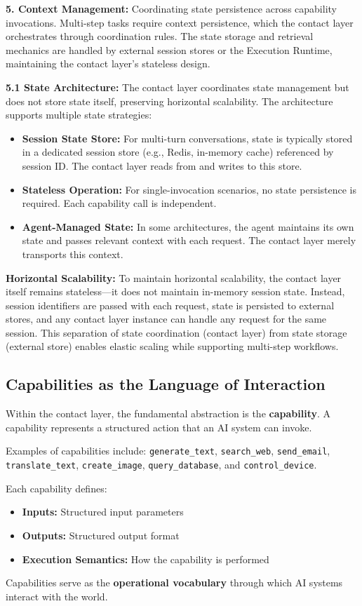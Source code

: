 \textbf{5. Context Management:} Coordinating state persistence across capability invocations. Multi-step tasks require context persistence, which the contact layer orchestrates through coordination rules. The state storage and retrieval mechanics are handled by external session stores or the Execution Runtime, maintaining the contact layer's stateless design.

\textbf{5.1 State Architecture:} The contact layer coordinates state management but does not store state itself, preserving horizontal scalability. The architecture supports multiple state strategies:
\begin{itemize}[leftmargin=*]
\item \textbf{Session State Store:} For multi-turn conversations, state is typically stored in a dedicated session store (e.g., Redis, in-memory cache) referenced by session ID. The contact layer reads from and writes to this store.
\item \textbf{Stateless Operation:} For single-invocation scenarios, no state persistence is required. Each capability call is independent.
\item \textbf{Agent-Managed State:} In some architectures, the agent maintains its own state and passes relevant context with each request. The contact layer merely transports this context.
\end{itemize}

\textbf{Horizontal Scalability:} To maintain horizontal scalability, the contact layer itself remains stateless---it does not maintain in-memory session state. Instead, session identifiers are passed with each request, state is persisted to external stores, and any contact layer instance can handle any request for the same session. This separation of state coordination (contact layer) from state storage (external store) enables elastic scaling while supporting multi-step workflows.

\subsection{Capabilities as the Language of Interaction}

Within the contact layer, the fundamental abstraction is the \textbf{capability}. A capability represents a structured action that an AI system can invoke.

Examples of capabilities include: \texttt{generate\_text}, \texttt{search\_web}, \texttt{send\_email}, \texttt{translate\_text}, \texttt{create\_image}, \texttt{query\_database}, and \texttt{control\_device}.

Each capability defines:
\begin{itemize}[leftmargin=*]
\item \textbf{Inputs:} Structured input parameters
\item \textbf{Outputs:} Structured output format
\item \textbf{Execution Semantics:} How the capability is performed
\end{itemize}

Capabilities serve as the \textbf{operational vocabulary} through which AI systems interact with the world.
